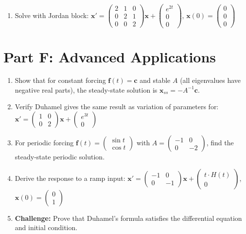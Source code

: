 \documentclass[12pt]{article}
\begin{document}
\begin{enumerate}[start=21]
\item Solve with Jordan block: $\mathbf{x}' = \begin{pmatrix} 2 & 1 & 0 \\ 0 & 2 & 1 \\ 0 & 0 & 2 \end{pmatrix}\mathbf{x} + \begin{pmatrix} e^{2t} \\ 0 \\ 0 \end{pmatrix}$, $\mathbf{x}(0) = \begin{pmatrix} 0 \\ 0 \\ 0 \end{pmatrix}$
\end{enumerate}

\section*{Part F: Advanced Applications}

\begin{enumerate}[start=26]
\item Show that for constant forcing $\mathbf{f}(t) = \mathbf{c}$ and stable $A$ (all eigenvalues have negative real parts), the steady-state solution is $\mathbf{x}_{ss} = -A^{-1}\mathbf{c}$.

\item Verify Duhamel gives the same result as variation of parameters for: $\mathbf{x}' = \begin{pmatrix} 1 & 0 \\ 0 & 2 \end{pmatrix}\mathbf{x} + \begin{pmatrix} e^{3t} \\ 0 \end{pmatrix}$

\item For periodic forcing $\mathbf{f}(t) = \begin{pmatrix} \sin t \\ \cos t \end{pmatrix}$ with $A = \begin{pmatrix} -1 & 0 \\ 0 & -2 \end{pmatrix}$, find the steady-state periodic solution.

\item Derive the response to a ramp input: $\mathbf{x}' = \begin{pmatrix} -1 & 0 \\ 0 & -1 \end{pmatrix}\mathbf{x} + \begin{pmatrix} t \cdot H(t) \\ 0 \end{pmatrix}$, $\mathbf{x}(0) = \begin{pmatrix} 0 \\ 1 \end{pmatrix}$

\item \textbf{Challenge:} Prove that Duhamel's formula satisfies the differential equation and initial condition.
\end{enumerate}
\end{document}
